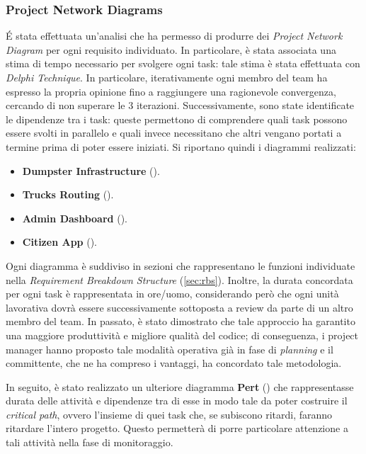\subsubsection{Project Network Diagrams}
\'E stata effettuata un'analisi che ha permesso di produrre dei \textit{Project Network Diagram} per ogni requisito individuato.
In particolare, è stata associata una stima di tempo necessario per svolgere ogni task: tale stima è stata effettuata con \textit{Delphi Technique}.
In particolare, iterativamente ogni membro del team ha espresso la propria opinione fino a raggiungere una ragionevole convergenza, cercando di non superare le 3 iterazioni.
Successivamente, sono state identificate le dipendenze tra i task: queste permettono di comprendere quali task possono essere svolti in parallelo e quali invece necessitano che altri vengano portati a termine prima di poter essere iniziati.
Si riportano quindi i diagrammi realizzati:
\begin{itemize}
    \item \textbf{Dumpster Infrastructure} ().
    \item \textbf{Trucks Routing} ().
    \item \textbf{Admin Dashboard} ().
    \item \textbf{Citizen App} ().
\end{itemize}
Ogni diagramma è suddiviso in sezioni che rappresentano le funzioni individuate nella \textit{Requirement Breakdown Structure} (\ref{sec:rbs}).
Inoltre, la durata concordata per ogni task è rappresentata in ore/uomo, considerando però che ogni unità lavorativa dovrà essere successivamente sottoposta a review da parte di un altro membro del team.
In passato, è stato dimostrato che tale approccio ha garantito una maggiore produttività e migliore qualità del codice; di conseguenza, i project manager hanno proposto tale modalità operativa già in fase di \textit{planning} e il committente, che ne ha compreso i vantaggi, ha concordato tale metodologia.

In seguito, è stato realizzato un ulteriore diagramma \textbf{Pert} () che rappresentasse durata delle attività e dipendenze tra di esse in modo tale da poter costruire il \textit{critical path}, ovvero l'insieme di quei task che, se subiscono ritardi, faranno ritardare l'intero progetto. Questo permetterà di porre particolare attenzione a tali attività nella fase di monitoraggio.

